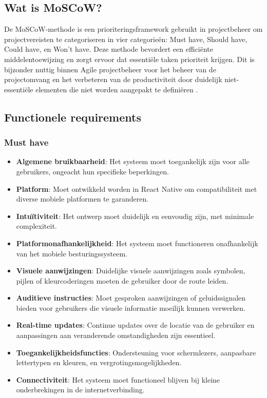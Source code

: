 \subsection{Wat is MoSCoW?}

De MoSCoW-methode is een prioriteringsframework gebruikt in projectbeheer om projectvereisten te categoriseren in vier categorieën: Must have, Should have, Could have, en Won't have. Deze methode bevordert een efficiënte middelentoewijzing en zorgt ervoor dat essentiële taken prioriteit krijgen. Dit is bijzonder nuttig binnen Agile projectbeheer voor het beheer van de projectomvang en het verbeteren van de productiviteit door duidelijk niet-essentiële elementen die niet worden aangepakt te definiëren \autocite{Brush2023}.

\subsection{Functionele requirements}
\label{sec:functionele-requirements}


\subsubsection{Must have}
\begin{itemize}
    \item \textbf{Algemene bruikbaarheid}: Het systeem moet toegankelijk zijn voor alle gebruikers, ongeacht hun specifieke beperkingen.
    \item \textbf{Platform}: Moet ontwikkeld worden in React Native om compatibiliteit met diverse mobiele platformen te garanderen.
    \item \textbf{Intuïtiviteit}: Het ontwerp moet duidelijk en eenvoudig zijn, met minimale complexiteit.
    \item \textbf{Platformonafhankelijkheid}: Het systeem moet functioneren onafhankelijk van het mobiele besturingssysteem.
    \item \textbf{Visuele aanwijzingen}: Duidelijke visuele aanwijzingen zoals symbolen, pijlen of kleurcoderingen moeten de gebruiker door de route leiden.
    \item \textbf{Auditieve instructies}: Moet gesproken aanwijzingen of geluidssignalen bieden voor gebruikers die visuele informatie moeilijk kunnen verwerken.
    \item \textbf{Real-time updates}: Continue updates over de locatie van de gebruiker en aanpassingen aan veranderende omstandigheden zijn essentieel.
    \item \textbf{Toegankelijkheidsfuncties}: Ondersteuning voor schermlezers, aanpasbare lettertypen en kleuren, en vergrotingsmogelijkheden.
    \item \textbf{Connectiviteit}: Het systeem moet functioneel blijven bij kleine onderbrekingen in de internetverbinding.
\end{itemize}

